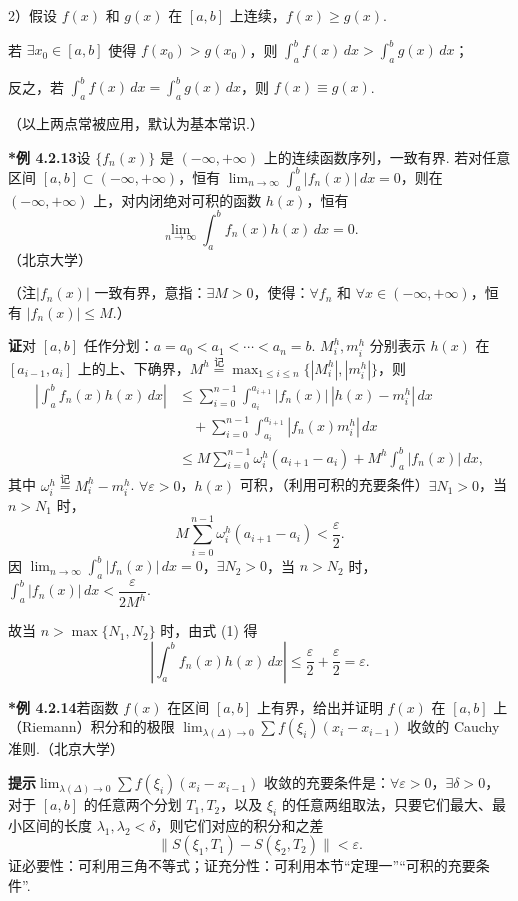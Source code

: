 \documentclass[UTF8, 12pt, fontset=fandol, oneside]{ctexart}
\begin{document}
2）假设 $f(x)$ 和 $g(x)$ 在 $[a,b]$ 上连续，$f(x)\ge g(x)$.

若 $\exists x_0\in[a,b]$ 使得 $f(x_0)>g(x_0)$，则 $\int_a^b f(x)\,dx>\int_a^b g(x)\,dx$；

反之，若 $\int_a^b f(x)\,dx=\int_a^b g(x)\,dx$，则 $f(x)\equiv g(x)$.

（以上两点常被应用，默认为基本常识.）

\noindent\textbf{*例 4.2.13}\quad 设 $\{f_n(x)\}$ 是 $(-\infty,+\infty)$ 上的连续函数序列，一致有界. 若对任意区间 $[a,b]\subset(-\infty,+\infty)$，恒有 $\lim_{n\to\infty}\int_a^b|f_n(x)|\,dx=0$，则在 $(-\infty,+\infty)$ 上，对内闭绝对可积的函数 $h(x)$，恒有
\[
\lim_{n\to\infty}\int_a^b f_n(x)h(x)\,dx=0.
\]
（北京大学）

（注\quad $|f_n(x)|$ 一致有界，意指：$\exists M>0$，使得：$\forall f_n$ 和 $\forall x\in(-\infty,+\infty)$，恒有 $|f_n(x)|\le M$.）

\noindent\textbf{证}\quad 对 $[a,b]$ 任作分划：$a=a_0<a_1<\cdots<a_n=b$. $M_i^h,m_i^h$ 分别表示 $h(x)$ 在 $[a_{i-1},a_i]$ 上的上、下确界，$M^h\stackrel{\text{记}}{=}\max_{1\le i\le n}\{|M_i^h|,|m_i^h|\}$，则
\[
\begin{aligned}
\left|\int_a^b f_n(x)h(x)\,dx\right|
&\le \sum_{i=0}^{n-1}\int_{a_i}^{a_{i+1}}|f_n(x)|\,|h(x)-m_i^h|\,dx\\
&\quad+\sum_{i=0}^{n-1}\int_{a_i}^{a_{i+1}}|f_n(x)m_i^h|\,dx\\
&\le M\sum_{i=0}^{n-1}\omega_i^h(a_{i+1}-a_i)
+M^h\int_a^b|f_n(x)|\,dx,
\end{aligned}
\tag{1}
\]
其中 $\omega_i^h\stackrel{\text{记}}{=}M_i^h-m_i^h$. $\forall\varepsilon>0$，$h(x)$ 可积，（利用可积的充要条件）$\exists N_1>0$，当 $n>N_1$ 时，
\[
M\sum_{i=0}^{n-1}\omega_i^h(a_{i+1}-a_i)<\frac{\varepsilon}{2}.
\]
因 $\lim_{n\to\infty}\int_a^b|f_n(x)|\,dx=0$，$\exists N_2>0$，当 $n>N_2$ 时，$\int_a^b|f_n(x)|\,dx<\dfrac{\varepsilon}{2M^h}$.

故当 $n>\max\{N_1,N_2\}$ 时，由式 (1) 得
\[
\left|\int_a^b f_n(x)h(x)\,dx\right|\le\frac{\varepsilon}{2}+\frac{\varepsilon}{2}=\varepsilon.
\]

\noindent\textbf{*例 4.2.14}\quad 若函数 $f(x)$ 在区间 $[a,b]$ 上有界，给出并证明 $f(x)$ 在 $[a,b]$ 上（Riemann）积分和的极限 $\lim_{\lambda(\Delta)\to0}\sum f(\xi_i)(x_i-x_{i-1})$ 收敛的 Cauchy 准则.（北京大学）

\noindent\textbf{提示}\quad $\lim_{\lambda(\Delta)\to0}\sum f(\xi_i)(x_i-x_{i-1})$ 收敛的充要条件是：$\forall\varepsilon>0$，$\exists\delta>0$，对于 $[a,b]$ 的任意两个分划 $T_1,T_2$，以及 $\xi_i$ 的任意两组取法，只要它们最大、最小区间的长度 $\lambda_1,\lambda_2<\delta$，则它们对应的积分和之差
\[
\|S(\xi_1,T_1)-S(\xi_2,T_2)\|<\varepsilon.
\tag{1}
\]
证必要性：可利用三角不等式；证充分性：可利用本节“定理一”“可积的充要条件”.
\end{document}
